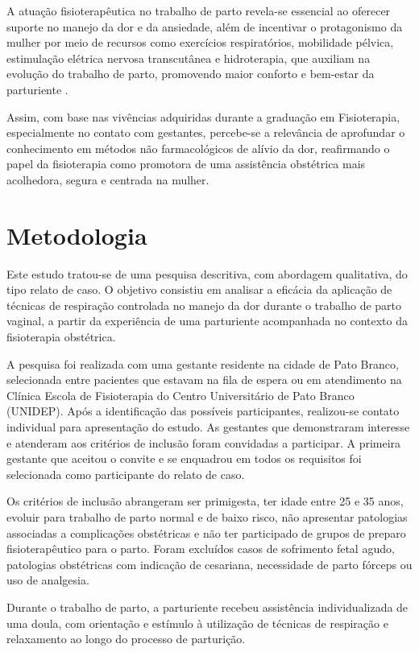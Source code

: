 \documentclass[openright]{tex/estilos/normas-utf-tex}
\begin{document}
A atuação fisioterapêutica no trabalho de parto revela-se essencial ao oferecer suporte no manejo da dor e da ansiedade, além de incentivar o protagonismo da mulher por meio de recursos como exercícios respiratórios, mobilidade pélvica, estimulação elétrica nervosa transcutânea e hidroterapia, que auxiliam na evolução do trabalho de parto, promovendo maior conforto e bem-estar da parturiente \cite{sousa2021}.

Assim, com base nas vivências adquiridas durante a graduação em Fisioterapia, especialmente no contato com gestantes, percebe-se a relevância de aprofundar o conhecimento em métodos não farmacológicos de alívio da dor, reafirmando o papel da fisioterapia como promotora de uma assistência obstétrica mais acolhedora, segura e centrada na mulher.

\chapter{Metodologia}
\label{chap:metodologia}

Este estudo tratou-se de uma pesquisa descritiva, com abordagem qualitativa, do tipo relato de caso. O objetivo consistiu em analisar a eficácia da aplicação de técnicas de respiração controlada no manejo da dor durante o trabalho de parto vaginal, a partir da experiência de uma parturiente acompanhada no contexto da fisioterapia obstétrica.

A pesquisa foi realizada com uma gestante residente na cidade de Pato Branco, selecionada entre pacientes que estavam na fila de espera ou em atendimento na Clínica Escola de Fisioterapia do Centro Universitário de Pato Branco (UNIDEP). Após a identificação das possíveis participantes, realizou-se contato individual para apresentação do estudo. As gestantes que demonstraram interesse e atenderam aos critérios de inclusão foram convidadas a participar. A primeira gestante que aceitou o convite e se enquadrou em todos os requisitos foi selecionada como participante do relato de caso.

Os critérios de inclusão abrangeram ser primigesta, ter idade entre 25 e 35 anos, evoluir para trabalho de parto normal e de baixo risco, não apresentar patologias associadas a complicações obstétricas e não ter participado de grupos de preparo fisioterapêutico para o parto. Foram excluídos casos de sofrimento fetal agudo, patologias obstétricas com indicação de cesariana, necessidade de parto fórceps ou uso de analgesia.

Durante o trabalho de parto, a parturiente recebeu assistência individualizada de uma doula, com orientação e estímulo à utilização de técnicas de respiração e relaxamento ao longo do processo de parturição.
\end{document}
